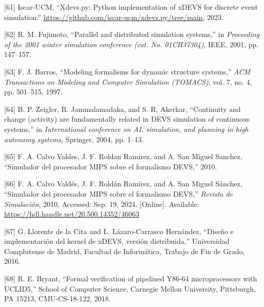 \documentclass[12pt,oneside]{templates/unerthesis}
\newcommand{\CSLLeftMargin}[1]{#1} %
\newcommand{\CSLRightInline}[1]{#1} %
\newlength{\cslhangindent}
\newenvironment{CSLReferences}[2] %
 {\setlength{\parindent}{0pt}%
  \setlength{\leftskip}{#1 pt\relax}%
  \setlength{\parskip}{#2 pt\relax}%
  \everypar{\setlength{\hangindent}{\cslhangindent}}}
 {\par}
\begin{document}
\begin{CSLReferences}{0}{0}
\leavevmode{}%
\CSLLeftMargin{{[}61{]} }%
\CSLRightInline{Iscar-UCM, {``Xdevs.py: Python implementation of xDEVS for discrete event simulation.''} \url{https://github.com/iscar-ucm/xdevs.py/tree/main}, 2023.}

\leavevmode{}%
\CSLLeftMargin{{[}62{]} }%
\CSLRightInline{R. M. Fujimoto, {``Parallel and distributed simulation systems,''} in \emph{Proceeding of the 2001 winter simulation conference (cat. No. 01CH37304)}, IEEE, 2001, pp. 147--157.}

\leavevmode{}%
\CSLLeftMargin{{[}63{]} }%
\CSLRightInline{F. J. Barros, {``Modeling formalisms for dynamic structure systems,''} \emph{ACM Transactions on Modeling and Computer Simulation (TOMACS)}, vol. 7, no. 4, pp. 501--515, 1997.}

\leavevmode{}%
\CSLLeftMargin{{[}64{]} }%
\CSLRightInline{B. P. Zeigler, R. Jammalamadaka, and S. R. Akerkar, {``Continuity and change (activity) are fundamentally related in DEVS simulation of continuous systems,''} in \emph{International conference on AI, simulation, and planning in high autonomy systems}, Springer, 2004, pp. 1--13.}

\leavevmode{}%
\CSLLeftMargin{{[}65{]} }%
\CSLRightInline{F. A. Calvo Valdes, J. F. Roldan Ramirez, and A. San Miguel Sanchez, {``Simulador del procesador MIPS sobre el formalismo DEVS,''} 2010.}

\leavevmode{}%
\CSLLeftMargin{{[}66{]} }%
\CSLRightInline{F. A. Calvo Valdés, J. F. Roldán Ramírez, and A. San Miguel Sánchez, {``Simulador del procesador {MIPS} sobre el formalismo {DEVS},''} \emph{Revista de Simulación}, 2010, Accessed: Sep. 19, 2024. {[}Online{]}. Available: \url{https://hdl.handle.net/20.500.14352/46063}}

\leavevmode{}%
\CSLLeftMargin{{[}67{]} }%
\CSLRightInline{G. Llorente de la Cita and L. Lázaro-Carrasco Hernández, {``Diseño e implementación del kernel de xDEVS, versión distribuida,''} Universidad Complutense de Madrid, Facultad de Informática, Trabajo de Fin de Grado, 2016.}

\leavevmode{}%
\CSLLeftMargin{{[}68{]} }%
\CSLRightInline{R. E. Bryant, {``Formal verification of pipelined Y86-64 microprocessors with UCLID5,''} School of Computer Science, Carnegie Mellon University, Pittsburgh, PA 15213, CMU-CS-18-122, 2018.}


\end{CSLReferences}
\end{document}
